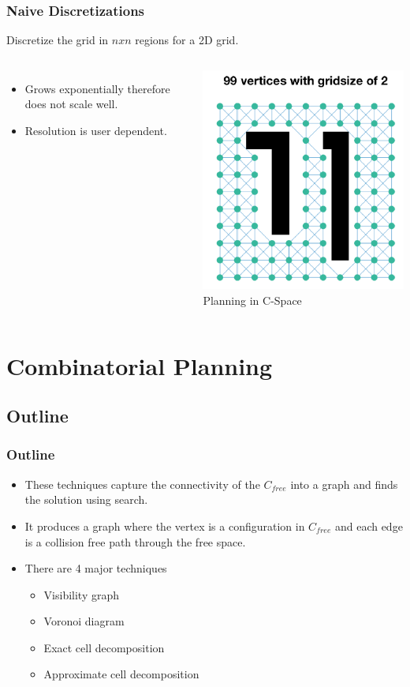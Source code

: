 \documentclass{beamer}
\begin{document}
\begin{frame}
\frametitle{Naive Discretizations}
Discretize the grid in $nxn$ regions for a 2D grid.

\begin{columns}[c] 
\vspace{-0.5cm}
\begin{itemize}
\item Grows exponentially therefore does not scale well.
\item Resolution is user dependent.
\end{itemize}
\centering
 \includegraphics[width=.45\textwidth]{figures/naivediscretization.png}\\
Planning in C-Space
\end{columns}

\end{frame}
\section{Combinatorial Planning}
\subsection{Outline}
\begin{frame}
\frametitle{Outline}
\begin{itemize}
\item These techniques capture the connectivity of the $C_{free}$ into a graph and finds the solution using search. 
\item It produces a graph where the vertex is a configuration in $C_{free}$ and each edge is a collision free path through the free space. 
\item There are 4 major techniques
\begin{itemize}
\item Visibility graph
\item Voronoi diagram 
\item Exact cell decomposition
\item Approximate cell decomposition
\end{itemize}
\end{itemize}
\end{frame}
\end{document}
